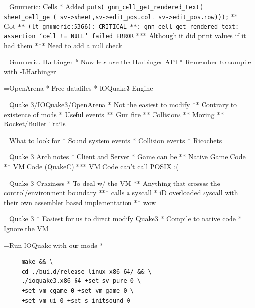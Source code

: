 \documentclass[titlepage,usenames,a4,landscape,semhelv]{seminar}
\begin{document}
\begin{slide}
=Gnumeric: Cells
* Added 
  \texttt{puts( gnm\_cell\_get\_rendered\_text( sheet\_cell\_get( sv->sheet,sv->edit\_pos.col, sv->edit\_pos.row)));}
** Got
\texttt{** (lt-gnumeric:5366): CRITICAL **: gnm\_cell\_get\_rendered\_text: assertion `cell != NULL' failed ERROR}
*** Although it did print values if it had them
*** Need to add a null check

=Gnumeric: Harbinger
* Now lets use the Harbinger API
* Remember to compile with -LHarbinger


=OpenArena
* Free datafiles
* IOQuake3 Engine

=Quake 3/IOQuake3/OpenArena
* Not the easiest to modify
** Contrary to existence of mods
* Useful events
** Gun fire
** Collisions
** Moving
** Rocket/Bullet Trails

=What to look for
* Sound system events
* Collision events
* Ricochets

=Quake 3 Arch notes
* Client and Server
* Game can be
** Native Game Code
** VM Code (QuakeC)
*** VM Code can't call POSIX :(

=Quake 3 Craziness
* To deal w/ the VM
** Anything that crosses the control/environment boundary
*** calls a syscall
* iD overloaded syscall with their own assembler based implementation
** wow 

=Quake 3
* Easiest for us to direct modify Quake3
* Compile to native code
* Ignore the VM

=Run IOQuake with our mods
*  \begin{verbatim}
     make && \
     cd ./build/release-linux-x86_64/ && \
     ./ioquake3.x86_64 +set sv_pure 0 \
     +set vm_cgame 0 +set vm_game 0 \ 
     +set vm_ui 0 +set s_initsound 0
\end{verbatim}

\end{slide}
\end{document}
